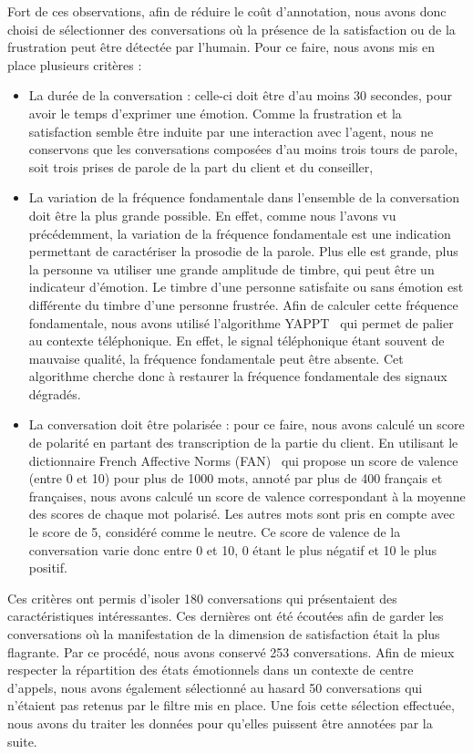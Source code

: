 Fort de ces observations, afin de réduire le coût d'annotation, nous avons donc choisi de sélectionner des conversations où la présence de la satisfaction ou de la frustration peut être détectée par l'humain. Pour ce faire, nous avons mis en place plusieurs critères :
\begin{itemize}
  \item La durée de la conversation : celle-ci doit être d'au moins 30 secondes, pour avoir le temps d'exprimer une émotion. Comme la frustration et la satisfaction semble être induite par une interaction avec l'agent, nous ne conservons que les conversations composées d'au moins trois tours de parole, soit trois prises de parole de la part du client et du conseiller,
  \item La variation de la fréquence fondamentale dans l'ensemble de la conversation doit être la plus grande possible. En effet, comme nous l'avons vu précédemment, la variation de la fréquence fondamentale est une indication permettant de caractériser la prosodie de la parole. Plus elle est grande, plus la personne va utiliser une grande amplitude de timbre, qui peut être un indicateur d'émotion. Le timbre d'une personne satisfaite ou sans émotion est différente du timbre d'une personne frustrée. Afin de calculer cette fréquence fondamentale, nous avons utilisé l'algorithme YAPPT~\cite{Zahorian2008} qui permet de palier au contexte téléphonique. En effet, le signal téléphonique étant souvent de mauvaise qualité, la fréquence fondamentale peut être absente. Cet algorithme cherche donc à restaurer la fréquence fondamentale des signaux dégradés.
  \item La conversation doit être polarisée : pour ce faire, nous avons calculé un score de polarité en partant des transcription de la partie du client. En utilisant le dictionnaire French Affective Norms (FAN)~\cite{Monnier2014} qui propose un score de valence (entre 0 et 10) pour plus de 1000 mots, annoté par plus de 400 français et françaises, nous avons calculé un score de valence correspondant à la moyenne des scores de chaque mot polarisé. Les autres mots sont pris en compte avec le score de 5, considéré comme le neutre. Ce score de valence de la conversation varie donc entre 0 et 10, 0 étant le plus négatif et 10 le plus positif.
\end{itemize}
Ces critères ont permis d'isoler 180 conversations qui présentaient des caractéristiques intéressantes. Ces dernières ont été écoutées afin de garder les conversations où la manifestation de la dimension de satisfaction était la plus flagrante. Par ce procédé, nous avons conservé 253 conversations.
Afin de mieux respecter la répartition des états émotionnels dans un contexte de centre d'appels, nous avons également sélectionné au hasard 50 conversations qui n'étaient pas retenus par le filtre mis en place.
Une fois cette sélection effectuée, nous avons du traiter les données pour qu'elles puissent être annotées par la suite.


